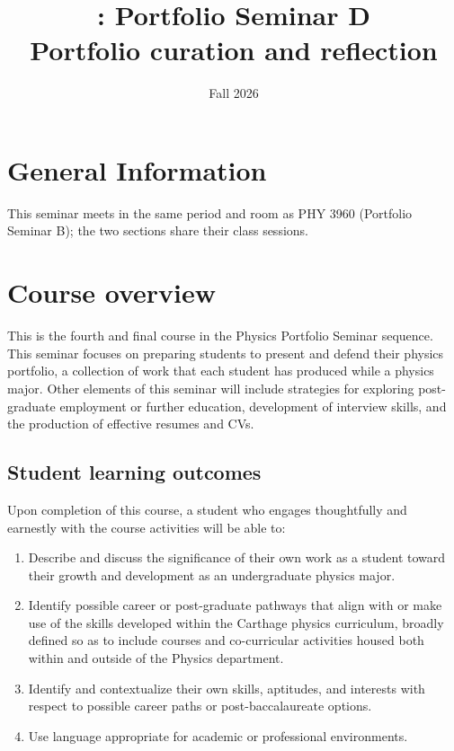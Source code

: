 \documentclass{syllabus}
\begin{document}
\thispagestyle{fancy}
\renewcommand{\lms}{Brightspace}
\date{Fall 2026}
\author{}
\title{\coursecode: Portfolio Seminar D \\ {\large \mdseries Portfolio curation and reflection}}
\maketitle



\section*{General Information}

\infotableport

\medskip
\noindent This seminar meets in the same period and room as PHY 3960 (Portfolio Seminar B); the two sections share their class sessions.

\section*{Course overview}

This is the fourth and final course in the Physics Portfolio Seminar sequence. This seminar focuses on
preparing students to present and defend their physics portfolio, a collection of work that each student has
produced while a physics major. Other elements of this seminar will include strategies for exploring post-graduate employment or further education, development of interview skills, and the production of
effective resumes and CVs.

\subsection*{Student learning outcomes}
Upon completion of this course, a student who engages thoughtfully and earnestly with the course activities will be able to:
\begin{enumerate}[label=\textcolor{CarthageDark}{\bfseries\arabic*.}]
    \item Describe and discuss the significance of their own work as a student toward their growth and development as an undergraduate physics major.
    \item Identify possible career or post-graduate pathways that align with or make use of the skills developed within the Carthage physics curriculum, broadly defined so as to include courses and co-curricular activities housed both within and outside of the Physics department.
    \item Identify and contextualize their own skills, aptitudes, and interests with respect to possible career paths or post-baccalaureate options.
    \item Use language appropriate for academic or professional environments.
\end{enumerate}
\end{document}
